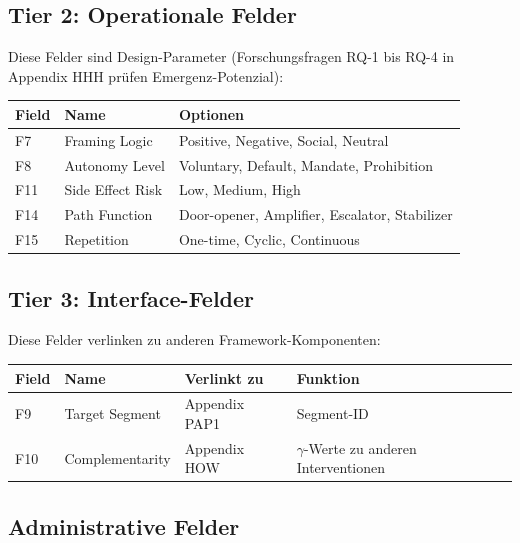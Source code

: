 \subsection{Tier 2: Operationale Felder}

Diese Felder sind Design-Parameter (Forschungsfragen RQ-1 bis RQ-4 in Appendix HHH prüfen Emergenz-Potenzial):

\begin{center}
\renewcommand{\arraystretch}{1.3}
\begin{tabular}{@{}lll@{}}
\toprule
\textbf{Field} & \textbf{Name} & \textbf{Optionen} \\
\midrule
F7 & Framing Logic & Positive, Negative, Social, Neutral \\
F8 & Autonomy Level & Voluntary, Default, Mandate, Prohibition \\
F11 & Side Effect Risk & Low, Medium, High \\
F14 & Path Function & Door-opener, Amplifier, Escalator, Stabilizer \\
F15 & Repetition & One-time, Cyclic, Continuous \\
\bottomrule
\end{tabular}
\end{center}


\subsection{Tier 3: Interface-Felder}

Diese Felder verlinken zu anderen Framework-Komponenten:

\begin{center}
\renewcommand{\arraystretch}{1.3}
\begin{tabular}{@{}llll@{}}
\toprule
\textbf{Field} & \textbf{Name} & \textbf{Verlinkt zu} & \textbf{Funktion} \\
\midrule
F9 & Target Segment & Appendix PAP1 & Segment-ID \\
F10 & Complementarity & Appendix HOW & $\gamma$-Werte zu anderen Interventionen \\
\bottomrule
\end{tabular}
\end{center}


\subsection{Administrative Felder}

